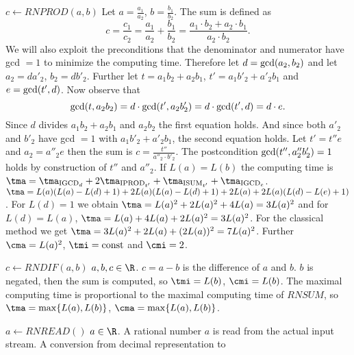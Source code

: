 \begin{deflist}{$c \gets RNPROD(a,b)$}
     Let $a = \frac{a_1}{a_2}$, $b = \frac{b_1}{b_2}$.
     The sum is defined as 
     \begin{displaymath}
     c = \frac{c_1}{c_2} =
     \frac{a_1}{a_2} + \frac{b_1}{b_2} =
     \frac{a_1 \cdot b_2 + a_2 \cdot b_1}{a_2 \cdot b_2}.
     \end{displaymath}
     We will also exploit the preconditions 
     that the denominator and numerator have gcd $=1$
     to minimize the computing time.
     Therefore let $d = {\rm gcd}(a_2,b_2)$ 
     and let $a_2 = d a'_2$, $b_2 = d b'_2$. 
     Further let $t = a_1 b_2 + a_2 b_1$, 
     $t' = a_1 b'_2 + a'_2 b_1$ and
     $e = {\rm gcd}(t',d)$.
     Now observe that 
     \begin{displaymath}
     {\rm gcd}(t,a_2 b_2) =
     d \cdot {\rm gcd}(t', a_2 b'_2) =
     d \cdot {\rm gcd}(t', d) = d \cdot e.
     \end{displaymath}
     Since $d$ divides $a_1 b_2 + a_2 b_1$ and
     $a_2 b_2$ the first equation holds.
     And since both $a'_2$ and $b'_2$ have gcd $=1$ with
     $a_1 b'_2 + a'_2 b_1$, the second equation holds.
     Let $t' = t'' e$ and $a_2 = a''_2 e$ then
     the sum is 
     $\displaystyle c = \frac{t''}{a''_2 \cdot b'_2}$.
     The postcondition ${\rm gcd}(t'', a''_2 b'_2) = 1$ holds
     by construction of $t''$ and $a''_2$.
     If $L(a) = L(b)$
     the computing time is 
     $\tma = \tma_{{\rm IGCD}_d} 
            + 2 \tma_{{\rm IPROD}_{t'}} + \tma_{{\rm ISUM}_{t'}} 
            + \tma_{{\rm IGCD}_e}$.
     $\tma = L(a) ( L(a) - L(d) + 1 ) 
             + 2 L(a) ( L(a) - L(d) + 1 ) + 2 L(a)
             + 2 L(a) ( L(d) - L(e) + 1 )$.
     For $L(d) = 1$ we obtain 
     $\tma = L(a)^2 + 2 L(a)^2 + 4 L(a) = 3 L(a)^2$
     and for $L(d) = L(a)$, 
     $\tma = L(a) + 4 L(a) + 2 L(a)^2 = 3 L(a)^2$.
     For the classical method we get 
     $\tma = 3 L(a)^2 + 2 L(a) + (2L(a))^2 = 7 L(a)^2$.
     Further $\cma = L(a)^2$, 
     $\tmi = {\rm const}$ and $\cmi = 2$.
\item[$c \gets RNDIF(a,b)$] $a, b, c \in \R$.
     $c = a - b$ is the difference of $a$ and $b$. 
     $b$ is negated, then the sum is computed, so
     $\tmi = L(b) $, $\cmi = L(b) $. 
     The maximal computing time is proportional to 
     the maximal computing time of $RNSUM$, so 
     $\tma = {\rm max}\{ L(a), L(b) \}$, 
     $\cma = {\rm max}\{ L(a), L(b) \}$. 
\item[$a \gets RNREAD()$] $a \in \R$.
     A rational number $a$ is read from the actual input stream.
     A conversion from decimal representation to 

\end{deflist}
